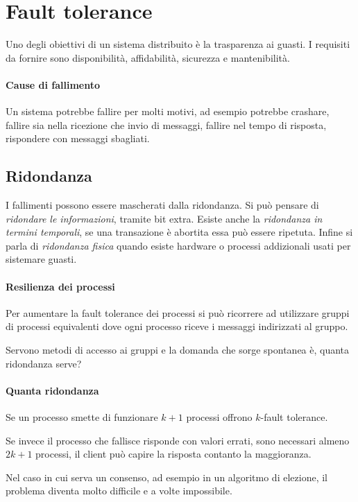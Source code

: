 \section{Fault tolerance}
Uno degli obiettivi di un sistema distribuito è
la trasparenza ai guasti. I requisiti da fornire sono 
disponibilità, affidabilità, sicurezza e mantenibilità.

\paragraph{Cause di fallimento}
Un sistema potrebbe fallire per molti motivi, ad esempio
potrebbe crashare, fallire sia nella ricezione che invio 
di messaggi, fallire nel tempo di risposta, rispondere 
con messaggi sbagliati.

\subsection{Ridondanza}
I fallimenti possono essere mascherati dalla ridondanza.
Si può pensare di \emph{ridondare le informazioni}, 
tramite bit extra. Esiste anche la \emph{ridondanza in termini 
temporali}, se una transazione è abortita essa può essere 
ripetuta. Infine si parla di \emph{ridondanza fisica} quando 
esiste hardware o processi addizionali usati per sistemare
guasti.

\paragraph{Resilienza dei processi}
Per aumentare la fault tolerance dei processi 
si può ricorrere ad utilizzare gruppi di processi 
equivalenti dove ogni processo riceve i messaggi indirizzati al gruppo.

Servono metodi di accesso ai gruppi e la domanda che 
sorge spontanea è, quanta ridondanza serve?

\paragraph{Quanta ridondanza}
Se un processo smette di funzionare $k + 1$ processi 
offrono $k$-fault tolerance.

Se invece il processo che fallisce risponde con valori 
errati, sono necessari almeno $2k +1$ processi, il client può 
capire la risposta contanto la maggioranza.

Nel caso in cui serva un consenso, ad esempio in un algoritmo 
di elezione, il problema diventa molto difficile e a volte 
impossibile.

